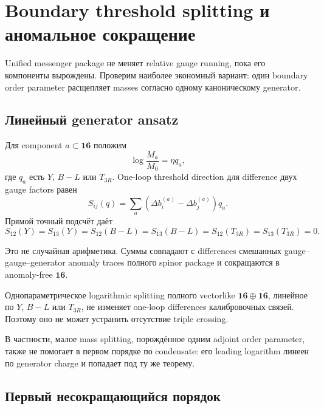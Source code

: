 \chapter{Boundary threshold splitting и аномальное сокращение}

Unified messenger package не меняет relative gauge running, пока его
компоненты вырождены. Проверим наиболее экономный вариант: один boundary
order parameter расщепляет masses согласно одному каноническому generator.

\section{Линейный generator ansatz}

Для component \(a\subset\mathbf{16}\) положим
\begin{equation}
 \log\frac{M_a}{M_0}=\eta q_a,
\end{equation}
где \(q_a\) есть \(Y\), \(B-L\) или \(T_{3R}\). One-loop threshold direction
для difference двух gauge factors равен
\begin{equation}
 S_{ij}(q)=\sum_a
 \left(\Delta b_i^{(a)}-\Delta b_j^{(a)}\right)q_a.
\end{equation}
Прямой точный подсчёт даёт
\begin{equation}
 S_{12}(Y)=S_{13}(Y)=S_{12}(B-L)=S_{13}(B-L)
 =S_{12}(T_{3R})=S_{13}(T_{3R})=0.
\end{equation}

Это не случайная арифметика. Суммы совпадают с differences смешанных
gauge--gauge--generator anomaly traces полного spinor package и сокращаются
в anomaly-free \(\mathbf{16}\).

\begin{theorem}
Однопараметрическое logarithmic splitting полного vectorlike
\(\mathbf{16}\oplus\overline{\mathbf{16}}\), линейное по \(Y\), \(B-L\) или
\(T_{3R}\), не изменяет one-loop differences калибровочных связей. Поэтому
оно не может устранить отсутствие triple crossing.
\end{theorem}

В частности, малое mass splitting, порождённое одним adjoint order
parameter, также не помогает в первом порядке по condensate: его leading
logarithm линеен по generator charge и попадает под ту же теорему.

\section{Первый несокращающийся порядок}

